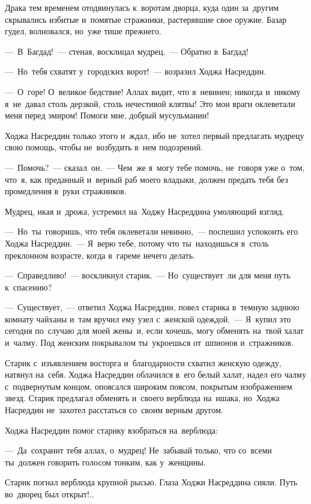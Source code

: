 \documentclass[12pt,a4paper]{book}
\begin{document}
Драка тем временем отодвинулась к~воротам дворца, куда один за~другим скрывались избитые и~помятые стражники, растерявшие свое оружие. Базар гудел, волновался, но~уже тише прежнего.

—~В~Багдад!~— стеная, восклицал мудрец.~— Обратно в~Багдад!

—~Но~тебя схватят у~городских ворот!~— возразил Ходжа Насреддин.

—~О~горе! О~великое бедствие! Аллах видит, что я~невинен; никогда и~никому я~не~давал столь дерзкой, столь нечестивой клятвы! Это мои враги оклеветали меня перед эмиром! Помоги мне, добрый мусульманин!

Ходжа Насреддин только этого и~ждал, ибо не~хотел первый предлагать мудрецу свою помощь, чтобы не~возбудить в~нем подозрений.

—~Помочь?~— сказал~он.~— Чем~же я~могу тебе помочь, не~говоря уже о~том, что~я, как преданный и~верный раб моего владыки, должен предать тебя без промедления в~руки стражников.

Мудрец, икая и~дрожа, устремил на~Ходжу Насреддина умоляющий взгляд.

—~Но~ты~говоришь, что тебя оклеветали невинно,~— поспешил успокоить его Ходжа Насреддин.~— Я~верю тебе, потому что ты~находишься в~столь преклонном возрасте, когда в~гареме нечего делать.

—~Справедливо!~— воскликнул старик.~— Но~существует~ли для меня путь к~спасению?

—~Существует,~— ответил Ходжа Насреддин, повел старика в~темную заднюю комнату чайханы и~там вручил ему узел с~женской одеждой.~— Я~купил это сегодня по~случаю для моей жены~и, если хочешь, могу обменять на~твой халат и~чалму. Под женским покрывалом ты~укроешься от~шпионов и~стражников.

Старик с~изъявлением восторга и~благодарности схватил женскую одежду, натянул на~себя. Ходжа Насреддин облачился в~его белый халат, надел его чалму с~подвернутым концом, опоясался широким поясом, покрытым изображением звезд. Старик предлагал обменять и~своего верблюда на~ишака, но~Ходжа Насреддин не~захотел расстаться со~своим верным другом.

Ходжа Насреддин помог старику взобраться на~верблюда:

—~Да~сохранит тебя аллах, о~мудрец! Не~забывай только, что со~всеми ты~должен говорить голосом тонким, как у~женщины.

Старик погнал верблюда крупной рысью. Глаза Ходжи Насреддина сияли. Путь во~дворец был открыт!..
\end{document}
